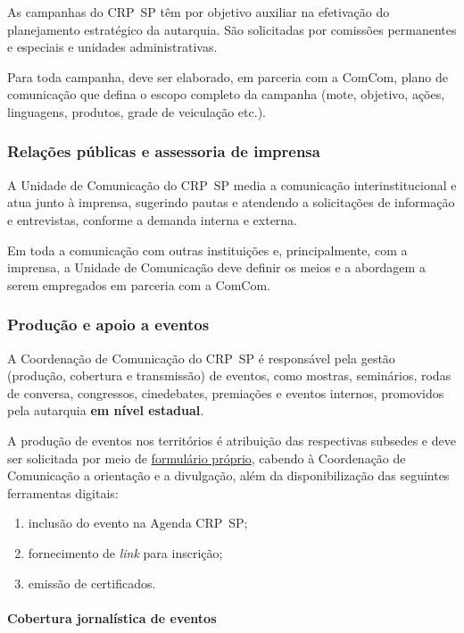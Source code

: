 As campanhas do CRP~SP têm por objetivo auxiliar na efetivação do
planejamento estratégico da autarquia. São solicitadas por comissões
permanentes e especiais e unidades administrativas.

Para toda campanha, deve ser elaborado, em parceria com a ComCom, plano
de comunicação que defina o escopo completo da campanha (mote, objetivo,
ações, linguagens, produtos, grade de veiculação etc.).

\subsubsection{Relações públicas e assessoria de
  imprensa}

A Unidade de Comunicação do CRP~SP media a comunicação
interinstitucional e atua junto à imprensa, sugerindo pautas e atendendo
a solicitações de informação e entrevistas, conforme a demanda interna e
externa.

Em toda a comunicação com outras instituições e, principalmente, com a
imprensa, a Unidade de Comunicação deve definir os meios e a abordagem a
serem empregados em parceria com a ComCom.

\subsubsection{Produção e apoio a
  eventos}

A Coordenação de Comunicação do CRP~SP é responsável pela gestão
(produção, cobertura e transmissão) de eventos, como mostras,
seminários, rodas de conversa, congressos, cinedebates, premiações e
eventos internos, promovidos pela autarquia \textbf{em nível estadual}.

A produção de eventos nos territórios é atribuição das respectivas
subsedes e deve ser solicitada por meio de
\href{https://forms.gle/yFMCSwpP6DQ5p9dA6}{formulário próprio}, cabendo
à Coordenação de Comunicação a orientação e a divulgação, além da
disponibilização das seguintes ferramentas digitais:

\begin{enumerate}

  \item
        inclusão do evento na Agenda CRP~SP;
  \item
        fornecimento de \emph{link} para inscrição;
  \item
        emissão de certificados.
\end{enumerate}

\paragraph{Cobertura jornalística de
  eventos}

